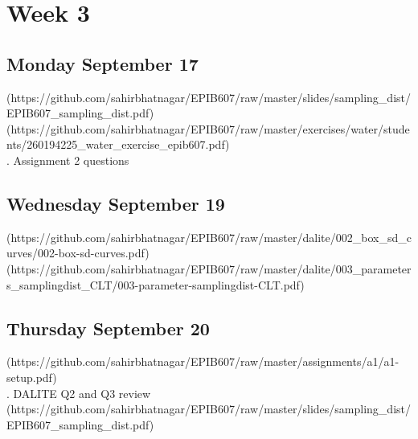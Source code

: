 \documentclass[]{book}
\let\originaltabular\tabular
\let\endoriginaltabular\endtabular
\renewenvironment{tabular}[1]{%
  \begingroup%
  \centering%
  \originaltabular{#1}}%
  {\endoriginaltabular\endgroup}
\theoremstyle{definition}
\theoremstyle{definition}
\theoremstyle{definition}
\theoremstyle{remark}
\begin{document}
\section{Week 3}\label{week-3}

\subsection{Monday September 17}\label{monday-september-17}

\begin{table}[H]
\centering
\begin{tabular}{l}
(https://github.com/sahirbhatnagar/EPIB607/raw/master/slides/sampling\_dist/EPIB607\_sampling\_dist.pdf)\\
(https://github.com/sahirbhatnagar/EPIB607/raw/master/exercises/water/students/260194225\_water\_exercise\_epib607.pdf)\\
. Assignment 2 questions\\
\hline
\end{tabular}
\end{table}

\subsection{Wednesday September 19}\label{wednesday-september-19}

\begin{table}[H]
\centering
\begin{tabular}{l}
(https://github.com/sahirbhatnagar/EPIB607/raw/master/dalite/002\_box\_sd\_curves/002-box-sd-curves.pdf)\\
(https://github.com/sahirbhatnagar/EPIB607/raw/master/dalite/003\_parameters\_samplingdist\_CLT/003-parameter-samplingdist-CLT.pdf)\\
\hline
\end{tabular}
\end{table}

\subsection{Thursday September 20}\label{thursday-september-20}

\begin{table}[H]
\centering
\begin{tabular}{l}
(https://github.com/sahirbhatnagar/EPIB607/raw/master/assignments/a1/a1-setup.pdf)\\
. DALITE Q2 and Q3 review\\
(https://github.com/sahirbhatnagar/EPIB607/raw/master/slides/sampling\_dist/EPIB607\_sampling\_dist.pdf)\\
\hline
\end{tabular}
\end{table}
\end{document}
